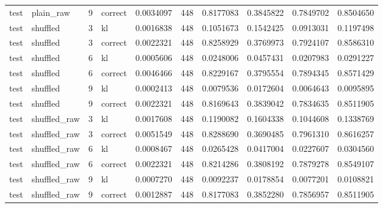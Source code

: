 \begin{tabular}{llrlrrrrrr}
test & plain_raw & 9 & correct & 0.0034097 & 448 & 0.8177083 & 0.3845822 & 0.7849702 & 0.8504650 \\
test & shuffled & 3 & kl & 0.0016838 & 448 & 0.1051673 & 0.1542425 & 0.0913031 & 0.1197498 \\
test & shuffled & 3 & correct & 0.0022321 & 448 & 0.8258929 & 0.3769973 & 0.7924107 & 0.8586310 \\
test & shuffled & 6 & kl & 0.0005606 & 448 & 0.0248006 & 0.0457431 & 0.0207983 & 0.0291227 \\
test & shuffled & 6 & correct & 0.0046466 & 448 & 0.8229167 & 0.3795554 & 0.7894345 & 0.8571429 \\
test & shuffled & 9 & kl & 0.0002413 & 448 & 0.0079536 & 0.0172604 & 0.0064643 & 0.0095895 \\
test & shuffled & 9 & correct & 0.0022321 & 448 & 0.8169643 & 0.3839042 & 0.7834635 & 0.8511905 \\
test & shuffled_raw & 3 & kl & 0.0017608 & 448 & 0.1190082 & 0.1604338 & 0.1044608 & 0.1338769 \\
test & shuffled_raw & 3 & correct & 0.0051549 & 448 & 0.8288690 & 0.3690485 & 0.7961310 & 0.8616257 \\
test & shuffled_raw & 6 & kl & 0.0008467 & 448 & 0.0265428 & 0.0417004 & 0.0227607 & 0.0304560 \\
test & shuffled_raw & 6 & correct & 0.0022321 & 448 & 0.8214286 & 0.3808192 & 0.7879278 & 0.8549107 \\
test & shuffled_raw & 9 & kl & 0.0007270 & 448 & 0.0092237 & 0.0178854 & 0.0077201 & 0.0108821 \\
test & shuffled_raw & 9 & correct & 0.0012887 & 448 & 0.8177083 & 0.3852280 & 0.7856957 & 0.8511905 \\
\bottomrule
\end{tabular}
